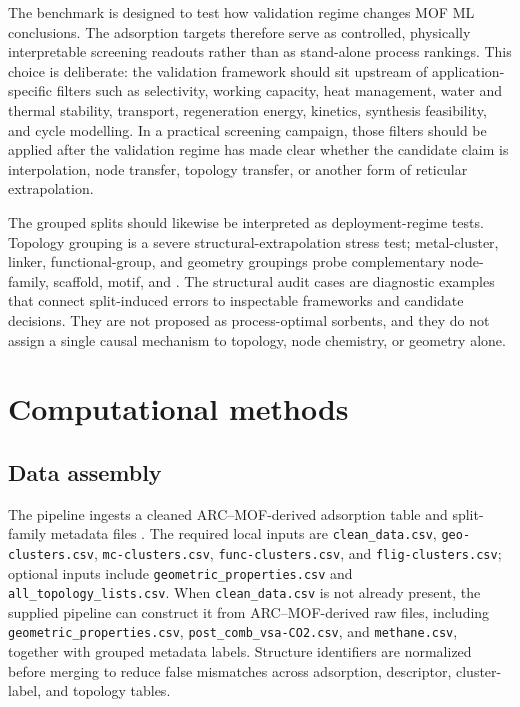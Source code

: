 \documentclass[11pt,a4paper]{article}
\newcommand{\del}[1]{}
\begin{document}
The benchmark is designed to test how validation regime changes MOF ML conclusions. The adsorption targets therefore serve as controlled, physically interpretable screening readouts rather than as stand-alone process rankings. This choice is deliberate: the validation framework should sit upstream of application-specific filters such as selectivity, working capacity, heat management, water and thermal stability, transport, regeneration energy, kinetics, synthesis feasibility, and cycle modelling. In a practical screening campaign, those filters should be applied after the validation regime has made clear whether the candidate claim is interpolation, node transfer, topology transfer, or another form of reticular extrapolation.

The grouped splits should likewise be interpreted as deployment-regime tests. Topology grouping is a severe structural-extrapolation stress test; metal-cluster, linker, functional-group, and geometry groupings probe complementary node-family, scaffold, motif, and \del{pore-regime transfer claims}. The structural audit cases are diagnostic examples that connect split-induced errors to inspectable frameworks and candidate decisions. They are not proposed as process-optimal sorbents, and they do not assign a single causal mechanism to topology, node chemistry, or geometry alone. 


\section*{Computational methods}
\subsection*{Data assembly}
The pipeline ingests a cleaned ARC--MOF-derived adsorption table and split-family metadata files \citep{Burner2023ARCMOF}. The required local inputs are \texttt{clean\_data.csv}, \texttt{geo-clusters.csv}, \texttt{mc-clusters.csv}, \texttt{func-clusters.csv}, and \texttt{flig-clusters.csv}; optional inputs include \texttt{geometric\_properties.csv} and \texttt{all\_topology\_lists.csv}. When \texttt{clean\_data.csv} is not already present, the supplied pipeline can construct it from ARC--MOF-derived raw files, including \texttt{geometric\_properties.csv}, \texttt{post\_comb\_vsa-CO2.csv}, and \texttt{methane.csv}, together with grouped metadata labels. Structure identifiers are normalized before merging to reduce false mismatches across adsorption, descriptor, cluster-label, and topology tables.
\end{document}
